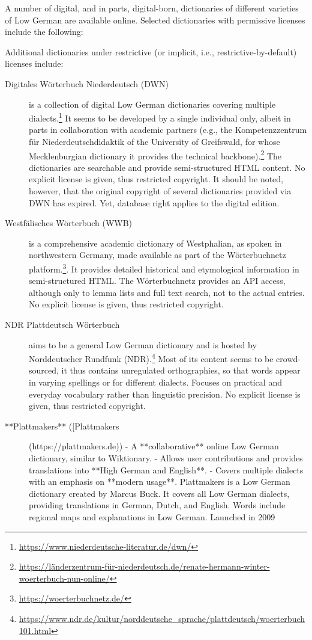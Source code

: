 \documentclass{article}
\begin{document}
A number of digital, and in parts, digital-born, dictionaries of different varieties of Low German are available online. Selected dictionaries with permissive licenses include the following:

Additional dictionaries under restrictive (or implicit, i.e., restrictive-by-default) licenses include:

\begin{description}
\item[Digitales Wörterbuch Niederdeutsch (DWN)] is a collection of digital Low German dictionaries covering multiple dialects.\footnote{\url{https://www.niederdeutsche-literatur.de/dwn/}} It seems to be developed by a single individual only, albeit in parts in collaboration with academic partners (e.g., the Kompetenzzentrum für Niederdeutschdidaktik of the University of Greifswald, for whose Mecklenburgian dictionary it provides the technical backbone).\footnote{\url{https://länderzentrum-für-niederdeutsch.de/renate-hermann-winter-woerterbuch-nun-online/}} The dictionaries are searchable and provide semi-structured HTML content. No explicit license is given, thus restricted copyright. It should be noted, however, that the original copyright of several dictionaries provided via DWN has expired. Yet, database right applies to the digital edition. 

\item[Westfälisches Wörterbuch (WWB)] is a comprehensive academic dictionary of Westphalian, as spoken in northwestern Germany, made available as part of the Wörterbuchnetz platform.\footnote{\url{https://woerterbuchnetz.de/}}. It provides detailed historical and etymological information in semi-structured HTML. The Wörterbuchnetz provides an API access, although only to lemma lists and full text search, not to the actual entries. No explicit license is given, thus restricted copyright.

\item[NDR Plattdeutsch Wörterbuch] aims to be a general Low German dictionary and is hosted by Norddeutscher Rundfunk (NDR).\footnote{\url{https://www.ndr.de/kultur/norddeutsche_sprache/plattdeutsch/woerterbuch101.html}} Most of its content seems to be crowd-sourced, it thus contains unregulated orthographies, so that words appear in varying spellings or for different dialects. Focuses on practical and everyday vocabulary rather than linguistic precision. No explicit license is given, thus restricted copyright.

\item[**Plattmakers** ([Plattmakers](https://plattmakers.de))  
   - A **collaborative** online Low German dictionary, similar to Wiktionary.  
   - Allows user contributions and provides translations into **High German and English**.  
   - Covers multiple dialects with an emphasis on **modern usage**. 
   Plattmakers is a Low German dictionary created by Marcus Buck. It covers all Low German dialects, providing translations in German, Dutch, and English. Words include regional maps and explanations in Low German. Launched in 2009



\end{description}
\end{document}

